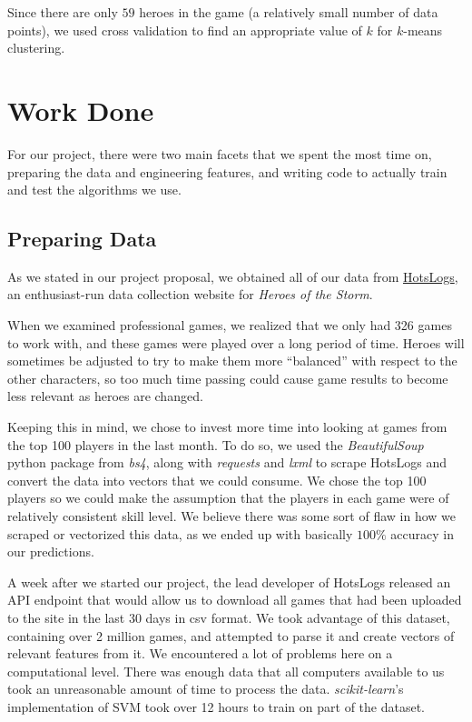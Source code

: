 \documentclass[11pt,letterpaper]{article}
\begin{document}
Since there are only $59$ heroes in the game (a relatively small number of data points), we used cross validation to find an appropriate value of $k$ for $k$-means clustering.

\section{Work Done}

For our project, there were two main facets that we spent the most time on, preparing the data and engineering features, and writing code to actually train and test the algorithms we use.


\subsection{Preparing Data}
As we stated in our project proposal, we obtained all of our data from \href{http://hotslogs.com}{HotsLogs}, an enthusiast-run data collection website for \textit{Heroes of the Storm}. 

When we examined professional games, we realized that we only had 326 games to work with, and these games were played over a long period of time. Heroes will sometimes be adjusted to try to make them more ``balanced'' with respect to the other characters, so too much time passing could cause game results to become less relevant as heroes are changed.

Keeping this in mind, we chose to invest more time into looking at games from the top 100 players in the last month. To do so, we used the \textit{BeautifulSoup} python package from \textit{bs4}, along with \textit{requests} and \textit{lxml} to scrape HotsLogs and convert the data into vectors that we could consume. We chose the top 100 players so we could make the assumption that the players in each game were of relatively consistent skill level. We believe there was some sort of flaw in how we scraped or vectorized this data, as we ended up with basically $100\%$ accuracy in our predictions.

A week after we started our project, the lead developer of HotsLogs released an API endpoint that would allow us to download all games that had been uploaded to the site in the last 30 days in csv format. We took advantage of this dataset, containing over 2 million games, and attempted to parse it and create vectors of relevant features from it. We encountered a lot of problems here on a computational level. There was enough data that all computers available to us took an unreasonable amount of time to process the data. \textit{scikit-learn}'s implementation of SVM took over 12 hours to train on part of the dataset. 
\end{document}
